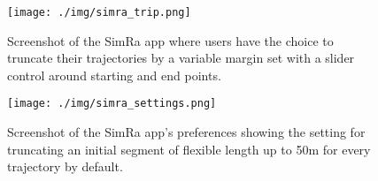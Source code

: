 \begin{figure}[H]
    \centering
    \texttt{[image: ./img/simra\_trip.png]}
    \caption{Screenshot of the SimRa app where users have the choice to truncate their trajectories by a variable margin set with a slider control around starting and end points.}
    \label{Figure:simratrip}
\end{figure}

\begin{figure}[H]
    \centering
    \texttt{[image: ./img/simra\_settings.png]}
    \caption{Screenshot of the SimRa app's preferences showing the setting for truncating an initial segment of flexible length up to 50m for every trajectory by default.}
    \label{Figure:simrasettings}
\end{figure}

